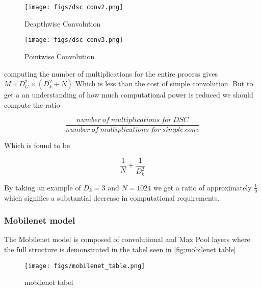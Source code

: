 \begin{figure}[ht]
	\centering
	\texttt{[image: figs/dsc conv2.png]}
	\caption{Deapthwise Convolution }\label{fig:dsc conv2}
\end{figure}

\begin{figure}[ht]
	\centering
	\texttt{[image: figs/dsc conv3.png]}
	\caption{Pointwise Convolution }\label{fig:dsc conv3}
\end{figure}

computing the number of multiplications for the entire process gives  $M \times D_{G}^{2} \times (D_{k}^{2}+N) $ Which is less than the cost of simple convolution. But to get a an understanding of how much computational power is reduced we should compute the ratio

$$
\frac{number\ of\ multiplications\ for\ DSC}{number\ of\ multiplications\ for\ simple\ conv}
$$

Which is found to be

$$
\frac{1}{N} + \frac{1}{D_{k}^2}
$$

By taking an example of $D_{k} = 3$ and $N = 1024$ we get a ratio of approximately $\frac{1}{9}$ which signifies a substantial decrease in computational requirements.

\subsubsection{Mobilenet model}

The Mobilenet model is composed of convolutional and Max Pool layers where the full structure is demonstrated in the tabel seen in \cref{fig:mobilenet table}

\begin{figure}[ht]
	\centering
	\texttt{[image: figs/mobilenet\_table.png]}
	\caption{mobilenet tabel }\label{fig:mobilenet tabel}
\end{figure}

